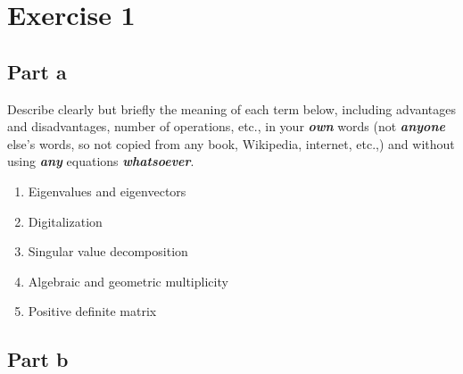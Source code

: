 \section{Exercise 1}
\subsection{Part a}

Describe clearly but briefly the meaning of each term below, including
advantages and disadvantages, number of operations, etc.,  in your
\emph{\textbf{own}} words (not \emph{\textbf{anyone}} else's words, so not copied
from any book, Wikipedia, internet, etc.,) and without using
\emph{\textbf{any}} equations \emph{\textbf{whatsoever}}.

\begin{enumerate}[label=\arabic*.]
    \item Eigenvalues and eigenvectors
    \item Digitalization 
    \item Singular value decomposition
    \item Algebraic and geometric multiplicity
    \item Positive definite matrix   
\end{enumerate}

\subsection{Part b}

